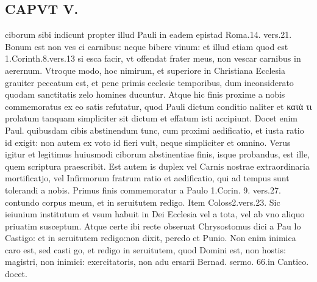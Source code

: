 \documentclass{article}
\begin{document}
\begin{pages}
\section*{CAPVT  V. }
\marginpar{[ p.375 ]}\pstart ciborum sibi indicunt propter illud Pauli in eadem epistad Roma.14. vers.21. Bonum est non ves ci carnibus: neque bibere vinum: et illud etiam quod est 1.Corinth.8.vers.13 si esca facir, vt offendat frater meus, non vescar carnibus in aerernum. Vtroque modo, hoc nimirum, et superiore in Christiana Ecclesia grauiter peccatum est, et pene primis ecclesie temporibus, dum inconsiderato quodam sanctitatis zelo homines ducuntur. Atque hic finis proxime a nobis commemoratus ex eo satis refutatur, quod Pauli dictum conditio naliter et κατὰ τι prolatum tanquam simpliciter sit dictum et effatum isti accipiunt. Docet enim Paul. quibusdam cibis abstinendum tunc, cum proximi aedificatio, et iusta ratio id exigit: non autem ex voto id fieri vult, neque simpliciter et omnino. Verus igitur et legitimus huiusmodi ciborum abstinentiae finis, isque probandus, est ille, quem scriptura praescribit. Est autem is duplex vel Carnis nostrae extraordinaria mortificatjo, vel Infirmorum fratrum ratio et aedificatio, qui ad tempus sunt tolerandi a nobis. Primus finis commemoratur a Paulo 1.Corin. 9. vers.27. contundo corpus meum, et in seruitutem redigo. Item Coloss2.vers.23. Sic ieiunium institutum et vsum habuit in Dei Ecclesia vel a tota, vel ab vno aliquo priuatim susceptum. Atque certe ibi recte obseruat Chrysostomus dici a Pau lo Castigo: et in seruitutem redigo:non dixit, peredo et Punio. Non enim inimica caro est, sed casti go, et redigo in seruitutem, quod Domini est, non hostis: magistri, non inimici: exercitatoris, non adu ersarii Bernad. sermo. 66.in Cantico. docet.  \pend

\end{pages}
\end{document}
